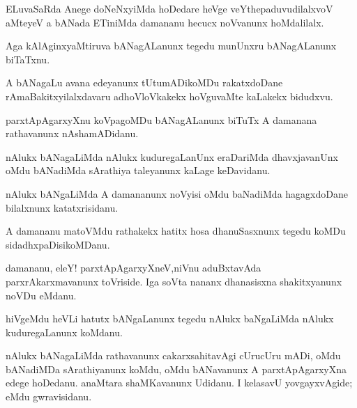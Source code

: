 \documentclass{article}
\begin{document}
\begin{mn}%
ELuvaSaRda Anege doNeNxyiMda hoDedare heVge veYthepaduvudilalxvoV aMteyeV a bANada 
ETiniMda damananu hecucx noVvanunx hoMdalilalx.
\end{mn}

\begin{mn}%
Aga kAlAginxyaMtiruva bANagALanunx tegedu munUnxru bANagALanunx biTaTxnu.
\end{mn}

\begin{mn}%
A bANagaLu avana edeyanunx tUtumADikoMDu rakatxdoDane rAmaBakitxyilalxdavaru 
adhoVloVkakekx hoVguvaMte kaLakekx bidudxvu.
\end{mn}

\begin{mn}%
parxtApAgarxyXnu koVpagoMDu bANagALanunx biTuTx A damanana rathavanunx nAshamADidanu.
\end{mn}

\begin{mn}%
nAlukx bANagaLiMda nAlukx kuduregaLanUnx eraDariMda dhavxjavanUnx oMdu bANadiMda sArathiya 
taleyanunx kaLage keDavidanu.
\end{mn}

\begin{mn}%
nAlukx bANgaLiMda A damananunx noVyisi oMdu baNadiMda hagagxdoDane bilalxnunx katatxrisidanu.
\end{mn}

\begin{mn}%
A damananu matoVMdu rathakekx hatitx hosa dhanuSasxnunx tegedu koMDu sidadhxpaDisikoMDanu.
\end{mn}

\begin{mn}%
damananu, eleY! parxtApAgarxyXneV,niVnu aduBxtavAda parxrAkarxmavanunx toVriside. Iga 
soVta nananx dhanasisxna shakitxyanunx noVDu eMdanu.
\end{mn}

\begin{mn}%
hiVgeMdu heVLi hatutx bANgaLanunx tegedu nAlukx baNgaLiMda nAlukx kuduregaLanunx koMdanu.
\end{mn}

\begin{mn}%
nAlukx bANagaLiMda rathavanunx cakarxsahitavAgi cUrucUru mADi, oMdu bANadiMDa 
sArathiyanunx koMdu, oMdu bANavanunx A parxtApAgarxyXna edege hoDedanu. anaMtara 
shaMKavanunx Udidanu. I kelasavU yovgayxvAgide; eMdu gwravisidanu.
\end{mn}
\end{document}
